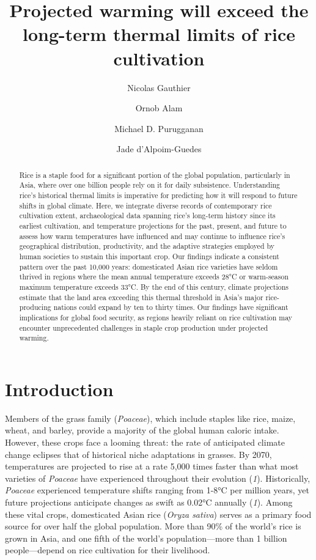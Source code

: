 \documentclass[
  letterpaper,
  DIV=11,
  numbers=noendperiod]{scrartcl}
\title{Projected warming will exceed the long-term thermal limits of
rice cultivation}
\author{Nicolas Gauthier \and Ornob Alam \and Michael D.
Purugganan \and Jade d'Alpoim-Guedes}
\date{}
\begin{document}
\maketitle
\begin{abstract}
Rice is a staple food for a significant portion of the global
population, particularly in Asia, where over one billion people rely on
it for daily subsistence. Understanding rice's historical thermal limits
is imperative for predicting how it will respond to future shifts in
global climate. Here, we integrate diverse records of contemporary rice
cultivation extent, archaeological data spanning rice's long-term
history since its earliest cultivation, and temperature projections for
the past, present, and future to assess how warm temperatures have
influenced and may continue to influence rice's geographical
distribution, productivity, and the adaptive strategies employed by
human societies to sustain this important crop. Our findings indicate a
consistent pattern over the past 10,000 years: domesticated Asian rice
varieties have seldom thrived in regions where the mean annual
temperature exceeds 28°C or warm-season maximum temperature exceeds
33°C. By the end of this century, climate projections estimate that the
land area exceeding this thermal threshold in Asia's major
rice-producing nations could expand by ten to thirty times. Our findings
have significant implications for global food security, as regions
heavily reliant on rice cultivation may encounter unprecedented
challenges in staple crop production under projected warming.
\end{abstract}


\newpage{}

\section{Introduction}\label{introduction}

Members of the grass family (\emph{Poaceae}), which include staples like
rice, maize, wheat, and barley, provide a majority of the global human
caloric intake. However, these crops face a looming threat: the rate of
anticipated climate change eclipses that of historical niche adaptations
in grasses. By 2070, temperatures are projected to rise at a rate 5,000
times faster than what most varieties of \emph{Poaceae} have experienced
throughout their evolution (\emph{1}). Historically, \emph{Poaceae}
experienced temperature shifts ranging from 1-8°C per million years, yet
future projections anticipate changes as swift as 0.02°C annually
(\emph{1}). Among these vital crops, domesticated Asian rice
(\emph{Oryza sativa}) serves as a primary food source for over half the
global population. More than 90\% of the world's rice is grown in Asia,
and one fifth of the world's population---more than 1 billion
people---depend on rice cultivation for their livelihood.
\end{document}
